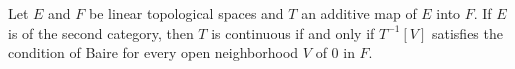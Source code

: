 Let $E$ and $F$ be linear topological spaces and $T$ an additive map of $E$ into $F$. If $E$ is of the second category, then $T$ is continuous if and only if $T^{-1}[V]$ satisfies the condition of Baire for every open neighborhood $V$ of $0$ in $F$.
